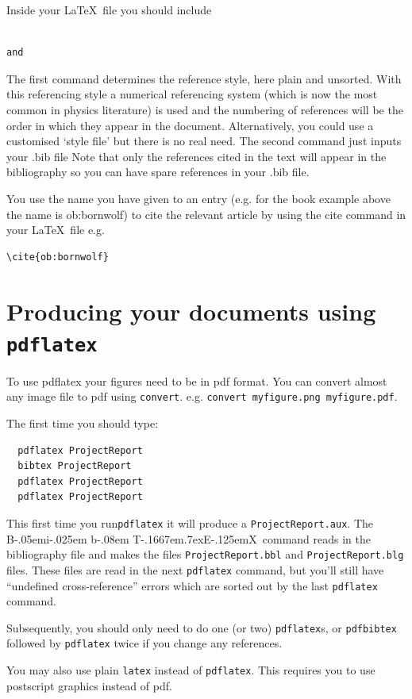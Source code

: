 \documentclass[12pt,a4paper]{report}
\def\BibTeX{{\rm B\kern-.05em{\sc i\kern-.025em b}\kern-.08em
    T\kern-.1667em\lower.7ex\hbox{E}\kern-.125emX}}
\begin{document}
Inside your \LaTeX\ file
you should include 
\begin{verbatim}
                      
and

\end{verbatim}
The first command determines the reference style, here plain and 
unsorted. With this referencing style 
a numerical referencing system (which is now the most
common in physics literature) is used and the numbering of references
will be the order in which they appear in the document. Alternatively, 
you could use
a customised `style file' but there is no real need.  The second
command just inputs your .bib file Note that only the references cited
in the text will appear in the bibliography so you can have spare
references in your .bib file.


You use the name you have given to an entry (e.g.
for the book example above the name is ob:bornwolf)
to cite the relevant article
by using the cite command in your \LaTeX\ file e.g. 
\begin{verbatim}
\cite{ob:bornwolf}
\end{verbatim}


\section{Producing your documents using \texttt{pdflatex}}

To use pdflatex your figures need to be in pdf format.  You can convert almost any image file to pdf using \texttt{convert}.  e.g. \texttt{convert myfigure.png myfigure.pdf}.

The first time you should type:
\begin{verbatim}
  pdflatex ProjectReport
  bibtex ProjectReport
  pdflatex ProjectReport
  pdflatex ProjectReport
\end{verbatim} 
This first time you run\texttt{pdflatex} it will produce a
\texttt{ProjectReport.aux}.  The \BibTeX\ command reads in the
bibliography file and makes the files \texttt{ProjectReport.bbl} and
\texttt{ProjectReport.blg} files.  These files are read in the next
\texttt{pdflatex} command, but you'll still have ``undefined
cross-reference'' errors which are sorted out by the last
\texttt{pdflatex} command.

Subsequently, you should only need to do one (or two)
\texttt{pdflatex}s, or \texttt{pdfbibtex} followed by
\texttt{pdflatex} twice if you change any references.

\vspace{5mm} You may also use plain \texttt{latex} instead of
\texttt{pdflatex}.  This requires you to use postscript graphics
instead of pdf.
\end{document}
